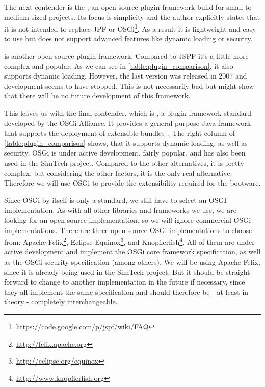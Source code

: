 The next contender is the , an open-source plugin framework build for small to medium sized projects.
Its focus is simplicity and the author explicitly states that it is not intended to replace JPF or OSGi\footnote{\url{https://code.google.com/p/jspf/wiki/FAQ}}.
As a result it is lightweight and easy to use but does not support advanced features like dynamic loading or security.

 is another open-source plugin framework.
Compared to JSPF it's a little more complex and popular.
As we can see in \autoref{table:plugin_comparison}, it also supports dynamic loading.
However, the last version was released in 2007 and development seems to have stopped.
This is not necessarily bad but might show that there will be no future development of this framework.

This leaves us with the final contender, which is , a plugin framework standard developed by the OSGi Alliance.
It provides a general-purpose Java framework that supports the deployment of extensible bundles~\autocite{osgi:spec}.
The right column of \autoref{table:plugin_comparison} shows, that it supports dynamic loading, as well as security.
OSGi is under active development, fairly popular, and has also been used in the SimTech project.
Compared to the other alternatives, it is pretty complex, but considering the other factors, it is the only real alternative.
Therefore we will use OSGi to provide the extensibility required for the bootware.

Since OSGi by itself is only a standard, we still have to select an OSGI implementation.
As with all other libraries and frameworks we use, we are looking for an open-source implementation, so we will ignore commercial OSGi implementations.
There are three open-source OSGi implementations to choose from: Apache Felix\footnote{\url{http://felix.apache.org}}, Eclipse Equinox\footnote{\url{http://eclipse.org/equinox}}, and Knopflerfish\footnote{\url{http://www.knopflerfish.org}}.
All of them are under active development and implement the OSGi core framework specification, as well as the OSGi security specification (among others).
We will be using Apache Felix, since it is already being used in the SimTech project.
But it should be straight forward to change to another implementation in the future if necessary, since they all implement the same specification and should therefore be - at least in theory - completely interchangeable.

